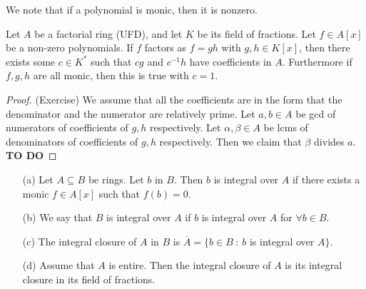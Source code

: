 We note that if a polynomial is monic, then it is nonzero.

\begin{lemma}
    Let $A$ be a factorial ring (UFD), and let $K$ be its field of fractions. Let $f \in A[x]$ be a non-zero polynomials. If $f$ factors as $f = gh$ with $g, h \in K[x]$, then there exists some $c \in K^*$ such that $cg$ and $c^{-1}h$ have coefficients in $A$. Furthermore if $f, g, h$ are all monic, then this is true with $c = 1$.
\end{lemma}
\begin{proof}
    (Exercise) We assume that all the coefficients are in the form that the denominator and the numerator are relatively prime. Let $a, b \in A$ be gcd of numerators of coefficients of $g, h$ respectively. Let $\alpha, \beta \in A$ be lcms of denominators of coefficients of $g, h$ respectively. Then we claim that $\beta$ divides $a$. \textbf{TO DO}
\end{proof}

\begin{definition}\noindent
\begin{itemize}
    \item[(a)] Let $A \subseteq B$ be rings. Let $b$ in $B$. Then $b$ is integral over $A$ if there exists a monic $f \in A[x]$ such that $f(b) = 0$.
    \item[(b)] We say that $B$ is integral over $A$ if $b$ is integral over $A$ for $\forall b \in B$.
    \item[(c)] The integral closure of $A$ in $B$ is $\overline{A} = \{b \in B \ : \ b $ is integral over $A\}$.
    \item[(d)] Assume that $A$ is entire. Then the integral closure of $A$ is its integral closure in its field of fractions. 
\end{itemize}
\end{definition}

